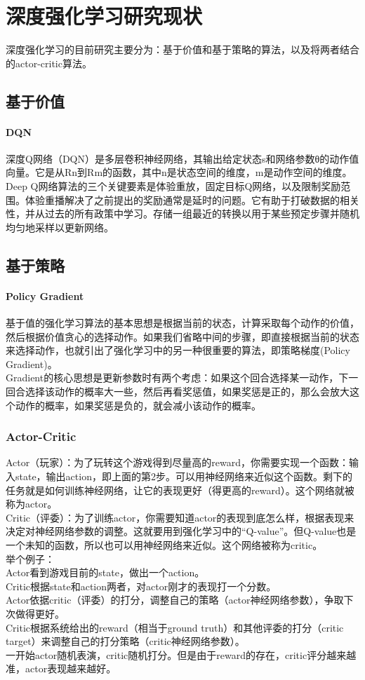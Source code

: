 \section{深度强化学习研究现状}
深度强化学习的目前研究主要分为：基于价值和基于策略的算法，以及将两者结合的actor-critic算法。
\subsection{基于价值}
\paragraph{DQN}
深度Q网络（DQN）是多层卷积神经网络，其输出给定状态s和网络参数θ的动作值向量。它是从Rn到Rm的函数，其中n是状态空间的维度，m是动作空间的维度。 Deep Q网络算法的三个关键要素是体验重放，固定目标Q网络，以及限制奖励范围。体验重播解决了之前提出的奖励通常是延时的问题。它有助于打破数据的相关性，并从过去的所有政策中学习。存储一组最近的转换以用于某些预定步骤并随机均匀地采样以更新网络。
\subsection{基于策略}
\paragraph{Policy Gradient}
基于值的强化学习算法的基本思想是根据当前的状态，计算采取每个动作的价值，然后根据价值贪心的选择动作。如果我们省略中间的步骤，即直接根据当前的状态来选择动作，也就引出了强化学习中的另一种很重要的算法，即策略梯度(Policy Gradient)。
\\
Gradient的核心思想是更新参数时有两个考虑：如果这个回合选择某一动作，下一回合选择该动作的概率大一些，然后再看奖惩值，如果奖惩是正的，那么会放大这个动作的概率，如果奖惩是负的，就会减小该动作的概率。
\subsubsection{Actor-Critic}
Actor（玩家）：为了玩转这个游戏得到尽量高的reward，你需要实现一个函数：输入state，输出action，即上面的第2步。可以用神经网络来近似这个函数。剩下的任务就是如何训练神经网络，让它的表现更好（得更高的reward）。这个网络就被称为actor。
\\
Critic（评委）：为了训练actor，你需要知道actor的表现到底怎么样，根据表现来决定对神经网络参数的调整。这就要用到强化学习中的“Q-value”。但Q-value也是一个未知的函数，所以也可以用神经网络来近似。这个网络被称为critic。
\\
举个例子：
\\
Actor看到游戏目前的state，做出一个action。
\\
Critic根据state和action两者，对actor刚才的表现打一个分数。
\\
Actor依据critic（评委）的打分，调整自己的策略（actor神经网络参数），争取下次做得更好。
\\
Critic根据系统给出的reward（相当于ground truth）和其他评委的打分（critic target）来调整自己的打分策略（critic神经网络参数）。
\\
一开始actor随机表演，critic随机打分。但是由于reward的存在，critic评分越来越准，actor表现越来越好。
